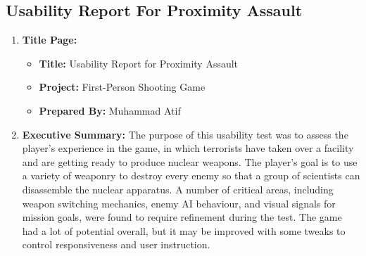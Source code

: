 \subsection{Usability Report For Proximity Assault}
\begin{enumerate}
	\item \textbf{Title Page:}
	\begin{itemize}
		\item \textbf{Title:} Usability Report for Proximity Assault
		\item \textbf{Project:} First-Person Shooting Game
		\item \textbf{Prepared By:} Muhammad Atif
	\end{itemize}
	\item \textbf{Executive Summary:}
	The purpose of this usability test was to assess the player's experience in the game, in which terrorists have taken over a facility and are getting ready to produce nuclear weapons. The player's goal is to use a variety of weaponry to destroy every enemy so that a group of scientists can disassemble the nuclear apparatus. A number of critical areas, including weapon switching mechanics, enemy AI behaviour, and visual signals for mission goals, were found to require refinement during the test. The game had a lot of potential overall, but it may be improved with some tweaks to control responsiveness and user instruction.
\end{enumerate}















